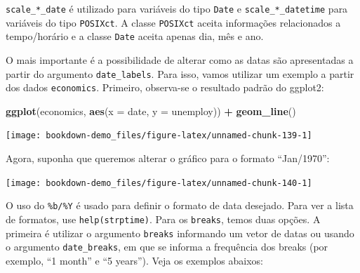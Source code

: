\documentclass[]{book}
\newenvironment{Shaded}{\begin{snugshade}}{\end{snugshade}}
\newcommand{\KeywordTok}[1]{\textcolor[rgb]{0.13,0.29,0.53}{\textbf{#1}}}
\newcommand{\DataTypeTok}[1]{\textcolor[rgb]{0.13,0.29,0.53}{#1}}
\newcommand{\StringTok}[1]{\textcolor[rgb]{0.31,0.60,0.02}{#1}}
\newcommand{\OperatorTok}[1]{\textcolor[rgb]{0.81,0.36,0.00}{\textbf{#1}}}
\newcommand{\NormalTok}[1]{#1}
\begin{document}
\texttt{scale\_*\_date} é utilizado para variáveis do tipo \texttt{Date}
e \texttt{scale\_*\_datetime} para variáveis do tipo \texttt{POSIXct}. A
classe \texttt{POSIXct} aceita informações relacionados a tempo/horário
e a classe \texttt{Date} aceita apenas dia, mês e ano.

O mais importante é a possibilidade de alterar como as datas são
apresentadas a partir do argumento \texttt{date\_labels}. Para isso,
vamos utilizar um exemplo a partir dos dados \texttt{economics}.
Primeiro, observa-se o resultado padrão do ggplot2:

\begin{Shaded}
\begin{Highlighting}[]
\KeywordTok{ggplot}\NormalTok{(economics, }\KeywordTok{aes}\NormalTok{(}\DataTypeTok{x =}\NormalTok{ date, }\DataTypeTok{y =}\NormalTok{ unemploy)) }\OperatorTok{+}
\StringTok{  }\KeywordTok{geom_line}\NormalTok{() }
\end{Highlighting}
\end{Shaded}

\begin{center}\texttt{[image: bookdown-demo\_files/figure-latex/unnamed-chunk-139-1]} \end{center}

Agora, suponha que queremos alterar o gráfico para o formato
``Jan/1970'':

\begin{Shaded}
\end{Shaded}

\begin{center}\texttt{[image: bookdown-demo\_files/figure-latex/unnamed-chunk-140-1]} \end{center}

O uso do \texttt{\%b/\%Y} é usado para definir o formato de data
desejado. Para ver a lista de formatos, use \texttt{help(strptime)}.
Para os \texttt{breaks}, temos duas opções. A primeira é utilizar o
argumento \texttt{breaks} informando um vetor de datas ou usando o
argumento \texttt{date\_breaks}, em que se informa a frequência dos
breaks (por exemplo, ``1 month'' e ``5 years''). Veja os exemplos
abaixos:
\end{document}
